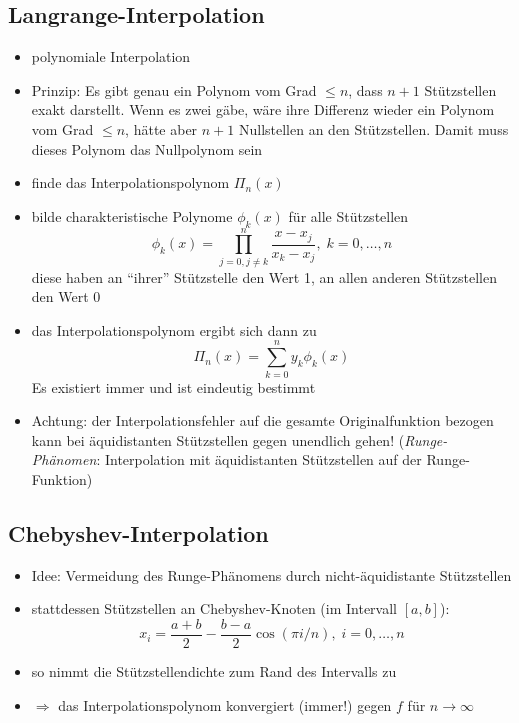 \documentclass[a4paper, 12pt]{article}
\begin{document}
\subsection{Langrange-Interpolation}
\begin{itemize}
  \item polynomiale Interpolation
  \item Prinzip: Es gibt genau ein Polynom vom Grad \(\le n\), dass \(n+1\) Stützstellen exakt darstellt. Wenn es zwei gäbe, wäre ihre Differenz wieder ein Polynom vom Grad \(\le n\), hätte aber \(n+1\) Nullstellen an den Stützstellen. Damit muss dieses Polynom das Nullpolynom sein
  \item finde das Interpolationspolynom \(\Pi_n(x)\)
  \item bilde charakteristische Polynome \(\phi_k(x)\) für alle Stützstellen
    \[\phi_k(x)=\prod^n_{j=0,j\ne k}\frac{x-x_j}{x_k-x_j},\; k=0,\ldots,n\]
    diese haben an ``ihrer'' Stützstelle den Wert 1, an allen anderen Stützstellen den Wert 0
  \item das Interpolationspolynom ergibt sich dann zu
    \[\Pi_n(x)=\sum^n_{k=0}y_k\phi_k(x)\]
    Es existiert immer und ist eindeutig bestimmt
  \item Achtung: der Interpolationsfehler auf die gesamte Originalfunktion bezogen kann bei äquidistanten Stützstellen gegen unendlich gehen! (\emph{Runge-Phänomen}: Interpolation mit äquidistanten Stützstellen auf der Runge-Funktion)
\end{itemize}


\subsection{Chebyshev-Interpolation}
\begin{itemize}
  \item Idee: Vermeidung des Runge-Phänomens durch nicht-äquidistante Stützstellen
  \item stattdessen Stützstellen an Chebyshev-Knoten (im Intervall \([a,b]\)):
    \[x_i=\frac{a+b}{2}-\frac{b-a}{2}\cos(\pi i/n),\; i=0,\ldots,n\]
  \item so nimmt die Stützstellendichte zum Rand des Intervalls zu
  \item \(\Rightarrow\) das Interpolationspolynom konvergiert (immer!) gegen \(f\) für \(n\rightarrow\infty\)
\end{itemize}
\end{document}
